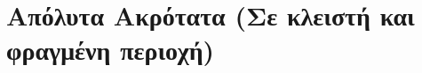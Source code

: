 \documentclass[a4paper,table]{report}
\begin{document}
\begin{enumerate}

\end{enumerate}



\section*{Απόλυτα Ακρότατα (Σε κλειστή και φραγμένη περιοχή)}
\end{document}
